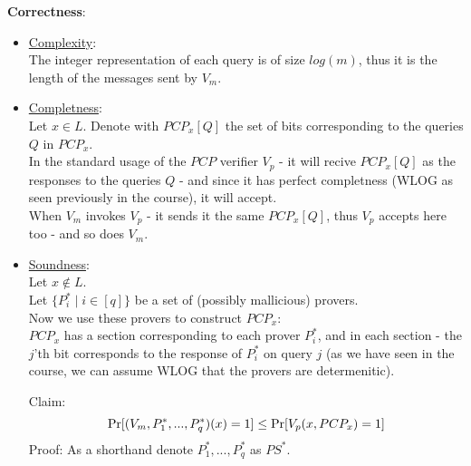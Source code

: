 \textbf{Correctness}:
\begin{itemize}
	\item \underline{Complexity}:\\
		The integer representation of each query is of size $log(m)$,
		thus it is the length of the messages sent by $V_m$.
	\item \underline{Completness}:\\
		Let $x\in L$. Denote with $PCP_x[Q]$ the set of bits
		corresponding to the queries $Q$ in $PCP_x$.\\
		In the standard usage of the $PCP$ verifier $V_p$ - 
		it will recive $PCP_x[Q]$ as the responses to the queries $Q$ - 
		and since it has perfect completness (WLOG as seen previously in the course),
		it will accept.\\
		When $V_m$ invokes $V_p$ - it sends it the same $PCP_x[Q]$,
		thus $V_p$ accepts here too - and so does $V_m$.
	\item \underline{Soundness}:\\
		Let $x\notin L$.\\
		Let $\{P_i^*\mid i\in[q]\}$ be a set of (possibly mallicious) provers.\\
		
		Now we use these provers to construct $PCP_x$:\\
		$PCP_x$ has a section corresponding to each prover $P_i^*$, and in each section - 
		the $j$'th bit corresponds to the response of $P_i^*$ on query $j$ (as we
		have seen in the course, we can assume WLOG that the provers are determenitic).
		

		Claim:
		\[
			\operatorname*{Pr}[(V_m,P_1^*,...,P_q^*)(x)=1]
			\leq \operatorname*{Pr}[V_p(x, PCP_x)=1]
		\]
		Proof:
		As a shorthand denote $P_1^*,...,P_q^*$ as $PS^*$.\\



\end{itemize}
